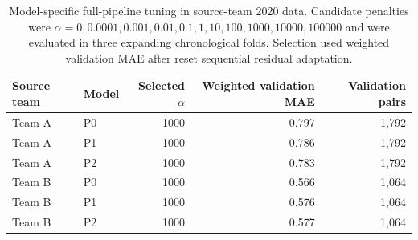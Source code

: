 \renewcommand{\thetable}{S\arabic{table}}
\setcounter{table}{0}

\begin{table}[htbp]
\centering
\caption{Model-specific full-pipeline tuning in source-team 2020 data. Candidate penalties were $\alpha=0,0.0001,0.001,0.01,0.1,1,10,100,1000,10000,100000$ and were evaluated in three expanding chronological folds. Selection used weighted validation MAE after reset sequential residual adaptation.}
\scriptsize
\begin{tabular}{llrrr}
\toprule
Source team & Model & Selected $\alpha$ & Weighted validation MAE & Validation pairs \\
\midrule
Team A & P0 & 1000 & 0.797 & 1,792 \\
Team A & P1 & 1000 & 0.786 & 1,792 \\
Team A & P2 & 1000 & 0.783 & 1,792 \\
Team B & P0 & 1000 & 0.566 & 1,064 \\
Team B & P1 & 1000 & 0.576 & 1,064 \\
Team B & P2 & 1000 & 0.577 & 1,064 \\
\bottomrule
\end{tabular}
\end{table}

